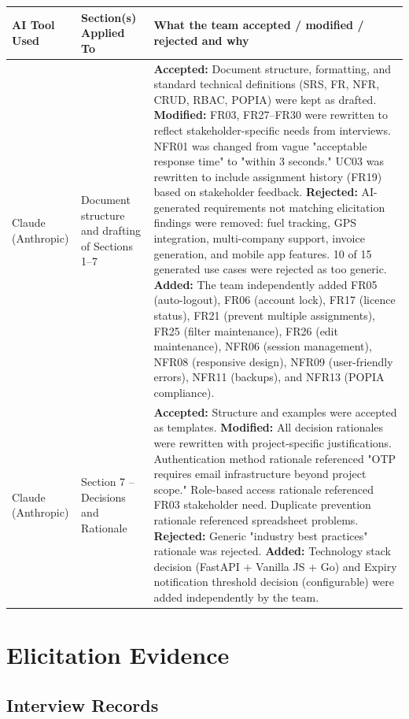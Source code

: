 \documentclass[11pt,a4paper]{article}
\begin{document}
\begin{longtable}{@{}p{2.6cm}p{3.6cm}p{9.1cm}@{}}
\toprule
AI Tool Used & Section(s) Applied To & What the team accepted / modified / rejected and why \\
\midrule
\endhead
Claude (Anthropic) & Document structure and drafting of Sections 1--7 & \textbf{Accepted:} Document structure, formatting, and standard technical definitions (SRS, FR, NFR, CRUD, RBAC, POPIA) were kept as drafted. \textbf{Modified:} FR03, FR27--FR30 were rewritten to reflect stakeholder-specific needs from interviews. NFR01 was changed from vague "acceptable response time" to "within 3 seconds." UC03 was rewritten to include assignment history (FR19) based on stakeholder feedback. \textbf{Rejected:} AI-generated requirements not matching elicitation findings were removed: fuel tracking, GPS integration, multi-company support, invoice generation, and mobile app features. 10 of 15 generated use cases were rejected as too generic. \textbf{Added:} The team independently added FR05 (auto-logout), FR06 (account lock), FR17 (licence status), FR21 (prevent multiple assignments), FR25 (filter maintenance), FR26 (edit maintenance), NFR06 (session management), NFR08 (responsive design), NFR09 (user-friendly errors), NFR11 (backups), and NFR13 (POPIA compliance). \\
Claude (Anthropic) & Section 7 -- Decisions and Rationale & \textbf{Accepted:} Structure and examples were accepted as templates. \textbf{Modified:} All decision rationales were rewritten with project-specific justifications. Authentication method rationale referenced "OTP requires email infrastructure beyond project scope." Role-based access rationale referenced FR03 stakeholder need. Duplicate prevention rationale referenced spreadsheet problems. \textbf{Rejected:} Generic "industry best practices" rationale was rejected. \textbf{Added:} Technology stack decision (FastAPI + Vanilla JS + Go) and Expiry notification threshold decision (configurable) were added independently by the team. \\
\bottomrule
\end{longtable}

\newpage
\appendix
\section{Elicitation Evidence}

\subsection{Interview Records}
\end{document}
